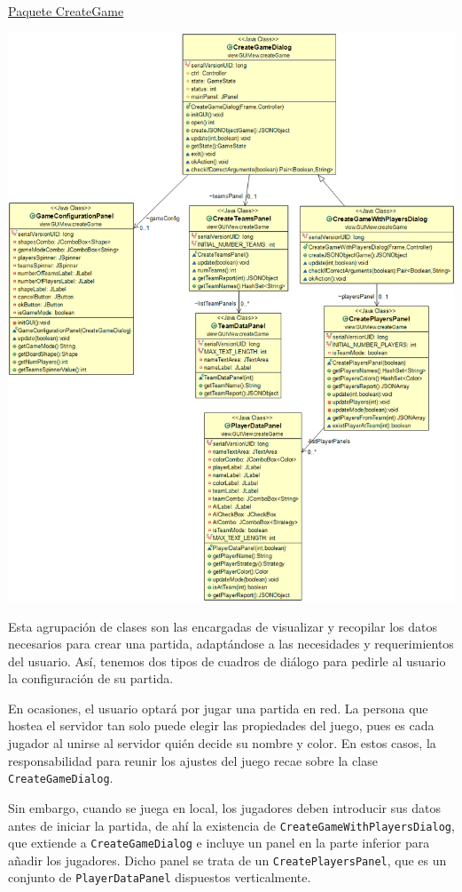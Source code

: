 \documentclass[12pt,a4paper,openright]{book}
\theoremstyle{break}
\begin{document}
\newpage
\underline{Paquete CreateGame}
\begin{center}
\includegraphics[scale=0.38]{CreateGamePaq.png} 
\end{center}

Esta agrupación de clases son las encargadas de visualizar y recopilar los datos necesarios para crear una partida, adaptándose a las necesidades y requerimientos del usuario. Así, tenemos dos tipos de cuadros de diálogo para pedirle al usuario la configuración de su partida.

En ocasiones, el usuario optará por jugar una partida en red. La persona que hostea el servidor tan solo puede elegir las propiedades del juego, pues es cada jugador al unirse al servidor quién decide su nombre y color. En estos casos, la responsabilidad para reunir los ajustes del juego recae sobre la clase \texttt{CreateGameDialog}.

Sin embargo, cuando se juega en local, los jugadores deben introducir sus datos antes de iniciar la partida, de ahí la existencia de \texttt{CreateGameWithPlayersDialog}, que extiende a \texttt{CreateGameDialog} e incluye un panel en la parte inferior para añadir los jugadores. Dicho panel se trata de un \texttt{CreatePlayersPanel}, que es un conjunto de \texttt{PlayerDataPanel} dispuestos verticalmente.
\end{document}

